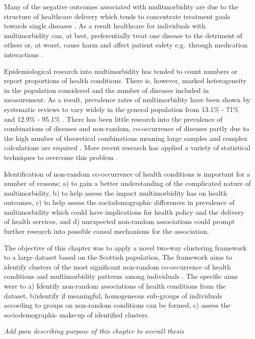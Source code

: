 \documentclass[12pt,]{report}
\begin{document}
Many of the negative outcomes associated with mulitmorbidity are due to
the structure of healthcare delivery which tends to concentrate
treatment goals towards single diseases \citep[\citet{RN290}]{RN155}. As
a result healthcare for individuals with multimorbidity can, at best,
preferentially treat one disease to the detriment of others or, at
worst, cause harm and affect patient safety e.g.~through medication
interactions \citep{RN289}.

Epidemiological research into multimorbidity has tended to count numbers
or report proportions of health conditions. There is, however, marked
heterogeneity in the population considered and the number of diseases
included in measurement. As a result, prevalence rates of multimorbidity
have been shown by systematic reviews to vary widely in the general
population from 13.1\% - 71\% \citep{RN56} and 12.9\% - 95.1\%
\citep{RN15}. There has been little research into the prevalence of
combinations of diseases and non-random, co-occurrence of diseases
partly due to the high number of theoretical combinations meaning large
samples and complex calculations are required \citep{RN91, RN187}. More
recent research has applied a variety of statistical techniques to
overcome this problem \citep{RN98}.

Identification of non-random co-occurrence of health conditions is
important for a number of reasons; a) to gain a better understanding of
the complicated nature of multimorbidity, b) to help assess the impact
multimorbidity has on health outcomes, c) to help assess the
sociodemographic differences in prevalence of multimorbidity which could
have implications for health policy and the delivery of health services,
and d) unexpected non-random associations could prompt further research
into possible causal mechanisms for the association.

The objective of this chapter was to apply a novel two-way clustering
framework to a large dataset based on the Scottish population, The
framework aims to identify clusters of the most significant non-random
co-occurrence of health conditions and multimorbidity patterns among
individuals \citep{RN72}. The specific aims were to a) Identify
non-random associations of health conditions from the dataset,
b)identify if meaningful, homogeneous sub-groups of individuals
according to groups on non-random conditions can be formed, c) assess
the sociodemographic make-up of identified clusters.

\emph{Add para describing purpose of this chapter to overall thesis}
\end{document}
